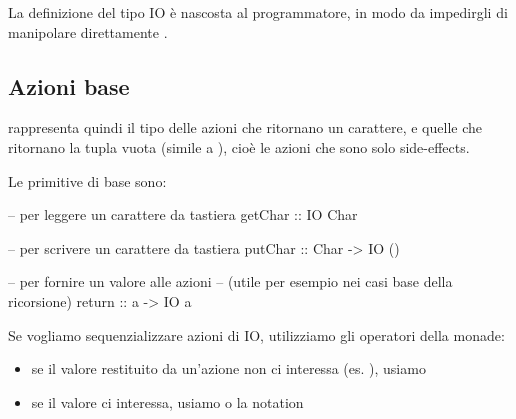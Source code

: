La definizione del tipo IO è nascosta al programmatore, in modo da impedirgli di manipolare direttamente .

\subsection{Azioni base}
 rappresenta quindi il tipo delle azioni che ritornano un carattere, e  quelle che ritornano la tupla vuota (simile a ), cioè le azioni che sono solo side-effects.

Le primitive di base sono:

\begin{haskellbox}{}
-- per leggere un carattere da tastiera
getChar :: IO Char

-- per scrivere un carattere da tastiera
putChar :: Char -> IO ()

-- per fornire un valore alle azioni 
-- (utile per esempio nei casi base della ricorsione)
return :: a -> IO a
\end{haskellbox}

Se vogliamo sequenzializzare azioni di IO, utilizziamo gli operatori della monade:
\begin{itemize}
    \item se il valore restituito da un'azione non ci interessa (es. ), usiamo \code{>>}
    \item se il valore ci interessa, usiamo \code{>>=} o la  notation
\end{itemize}

